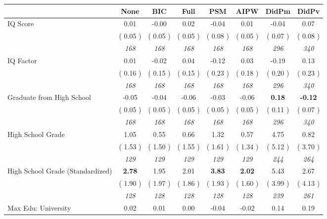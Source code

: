 \begin{tabular}{l c c c c c c c}
\toprule
 & None & BIC & Full & PSM & AIPW & DidPm & DidPv \\
\midrule
IQ Score &      0.01 &     -0.00 &      0.02 &     -0.04 &      0.01 &     -0.04 &      0.07 \\
& (     0.05 ) & (     0.05 ) & (     0.05 ) & (     0.08 ) & (     0.05 ) & (     0.07 ) & (     0.08 ) \\
& \textit{ 168 } & \textit{ 168 } & \textit{ 168 } & \textit{ 168 } & \textit{ 168 } & \textit{ 296 } & \textit{ 340 } \\
IQ Factor &      0.01 &     -0.02 &      0.04 &     -0.12 &      0.03 &     -0.19 &      0.13 \\
& (     0.16 ) & (     0.15 ) & (     0.15 ) & (     0.23 ) & (     0.18 ) & (     0.20 ) & (     0.23 ) \\
& \textit{ 168 } & \textit{ 168 } & \textit{ 168 } & \textit{ 168 } & \textit{ 168 } & \textit{ 296 } & \textit{ 340 } \\
Graduate from High School &     -0.05 &     -0.04 &     -0.06 &     -0.03 &     -0.06 & \textbf{      0.18 } & \textbf{     -0.12 } \\
& (     0.05 ) & (     0.05 ) & (     0.05 ) & (     0.05 ) & (     0.05 ) & (     0.11 ) & (     0.07 ) \\
& \textit{ 168 } & \textit{ 168 } & \textit{ 168 } & \textit{ 168 } & \textit{ 168 } & \textit{ 296 } & \textit{ 340 } \\
High School Grade &      1.05 &      0.55 &      0.66 &      1.32 &      0.57 &      4.75 &      0.82 \\
& (     1.53 ) & (     1.50 ) & (     1.55 ) & (     1.61 ) & (     1.34 ) & (     5.12 ) & (     3.70 ) \\
& \textit{ 129 } & \textit{ 129 } & \textit{ 129 } & \textit{ 129 } & \textit{ 129 } & \textit{ 244 } & \textit{ 264 } \\
High School Grade (Standardized) & \textbf{      2.78 } &      1.95 &      2.01 & \textbf{     3.83} & \textbf{     2.02} &      5.43 &      2.67 \\
& (     1.90 ) & (     1.97 ) & (     1.86 ) & (     1.93 ) & (     1.60 ) & (     3.99 ) & (     4.13 ) \\
& \textit{ 128 } & \textit{ 128 } & \textit{ 128 } & \textit{ 128 } & \textit{ 128 } & \textit{ 239 } & \textit{ 261 } \\
Max Edu: University &      0.02 &      0.01 &      0.00 &     -0.04 &     -0.02 &      0.14 &      0.19 \\

\end{tabular}
